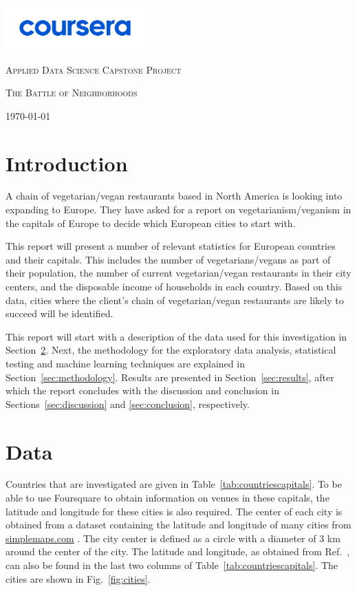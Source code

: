 \documentclass[12pt,a4paper]{article}
\begin{document}
\begin{titlepage}
	\centering
	\includegraphics[width=0.4\textwidth]{courseraLogo}\par\vspace{3cm}
	{\scshape\large Applied Data Science Capstone Project \par}
	\vspace{1cm}
	{\scshape\LARGE The Battle of Neighborhoods\par}
	\vfill
	{\large \today\par}
\end{titlepage}
\section{Introduction}
A chain of vegetarian/vegan restaurants based in North America is looking into expanding to Europe. They have asked for a report on vegetarianism/veganism in the capitals of Europe to decide which European cities to start with. 

This report will present a number of relevant statistics for European countries and their capitals. This includes the number of vegetarians/vegans as part of their population, the number of current vegetarian/vegan restaurants in their city centers, and the disposable income of households in each country. Based on this data, cities where the client's chain of vegetarian/vegan restaurants are likely to succeed will be identified.

This report will start with a description of the data used for this investigation in Section~\ref{sec:data}. Next, the methodology for the exploratory data analysis, statistical testing and machine learning techniques are explained in Section~\ref{sec:methodology}. Results are presented in Section~\ref{sec:results}, after which the report concludes with the discussion and conclusion in Sections~\ref{sec:discussion} and \ref{sec:conclusion}, respectively.

\section{Data}
\label{sec:data}
Countries that are investigated are given in Table~\ref{tab:countriescapitals}. To be able to use Foursquare to obtain information on venues in these capitals, the latitude and longitude for these cities is also required. The center of each city is obtained from a dataset containing the latitude and longitude of many cities from \url{simplemaps.com} \cite{latlong}. The city center is defined as a circle with a diameter of 3 km around the center of the city. The latitude and longitude, as obtained from Ref.~\cite{latlong}, can also be found in the last two columns of Table~\ref{tab:countriescapitals}. The cities are shown in Fig.~\ref{fig:cities}. 
\end{document}
